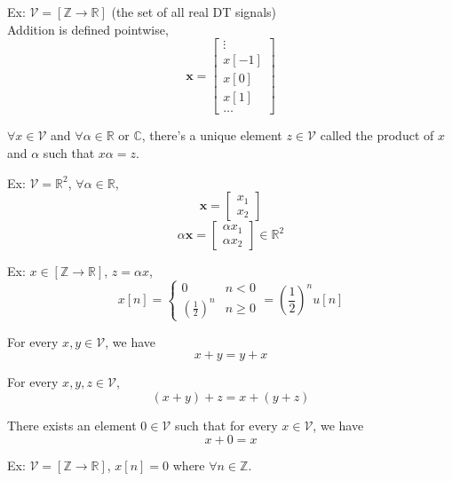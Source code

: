 \documentclass{article}
\begin{document}
Ex: $\mathcal{V} = [\mathbb{Z} \to \mathbb{R} ]$ (the set of all real DT signals) \\
Addition is defined pointwise,
$$ \bm{x} = \begin{bmatrix} \vdots \\ x[-1] \\ x[0] \\ x[1] \\ \dots \end{bmatrix} $$

\begin{definition}
$ \forall x \in \mathcal{V}$ and $\forall \alpha \in \mathbb{R}$ or $\mathbb{C}$,
there's a unique element $z \in \mathcal{V}$ called the product of $x$ and $\alpha$ such that $x \alpha = z$.
\end{definition}

Ex: $\mathcal{V} = \mathbb{R}^2$, $\forall \alpha \in \mathbb{R}$,
$$ \bm{x} = \begin{bmatrix} x_1 \\ x_2 \end{bmatrix} $$
$$ \alpha \bm{x} = \begin{bmatrix} \alpha x_1 \\ \alpha x_2 \end{bmatrix} \in \mathbb{R}^2 $$

Ex: $x \in [\mathbb{Z} \to \mathbb{R} ]$, $z = \alpha x$,
$$ x[n] = \begin{cases}
0 & n < 0 \\
(\frac{1}{2})^n & n \geq 0
\end{cases} = (\frac{1}{2})^n u [n]$$

\begin{definition}
  For every $x, y \in \mathcal{V}$, we have $$x + y = y + x$$
\end{definition}

\begin{definition}
  For every $x, y, z \in \mathcal{V}$,
  $$ (x + y) + z = x + (y + z) $$
\end{definition}

\begin{definition}
  There exists an element $0 \in \mathcal{V}$ such that for every $x \in \mathcal{V}$, we have $$x + 0 = x$$
\end{definition}

Ex: $\mathcal{V} = [\mathbb{Z} \to \mathbb{R} ]$, $x[n] = 0$ where $\forall n \in \mathbb{Z}$.
\end{document}
